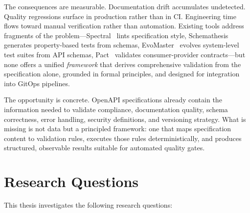The consequences are measurable. Documentation drift accumulates undetected. Quality regressions surface in production rather than in CI. Engineering time flows toward manual verification rather than automation. Existing tools address fragments of the problem---Spectral~\cite{spectral} lints specification style, Schemathesis~\cite{schemathesis} generates property-based tests from schemas, EvoMaster~\cite{evomaster} evolves system-level test suites from API schemas, Pact~\cite{pact} validates consumer-provider contracts---but none offers a unified \emph{framework} that derives comprehensive validation from the specification alone, grounded in formal principles, and designed for integration into GitOps pipelines.

The opportunity is concrete. OpenAPI specifications already contain the information needed to validate compliance, documentation quality, schema correctness, error handling, security definitions, and versioning strategy. What is missing is not data but a principled framework: one that maps specification content to validation rules, executes those rules deterministically, and produces structured, observable results suitable for automated quality gates.

\section{Research Questions}
\label{sec:research-questions}

This thesis investigates the following research questions:

